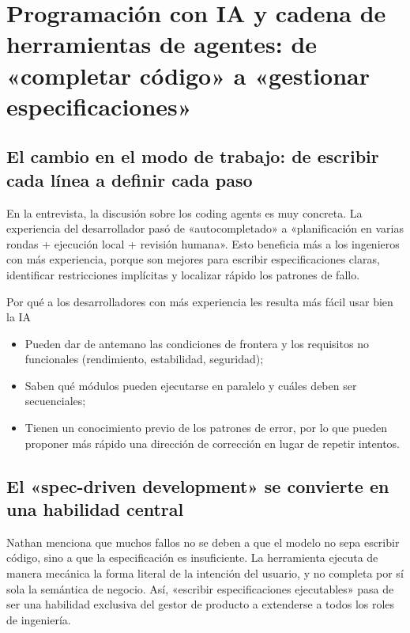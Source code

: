 \section{Programación con IA y cadena de herramientas de agentes: de «completar código» a «gestionar especificaciones»}

\subsection{El cambio en el modo de trabajo: de escribir cada línea a definir cada paso}

En la entrevista, la discusión sobre los coding agents es muy concreta. La experiencia del desarrollador pasó de «autocompletado» a «planificación en varias rondas + ejecución local + revisión humana». Esto beneficia más a los ingenieros con más experiencia, porque son mejores para escribir especificaciones claras, identificar restricciones implícitas y localizar rápido los patrones de fallo.

\begin{importantbox}{Por qué a los desarrolladores con más experiencia les resulta más fácil usar bien la IA}
\begin{itemize}[leftmargin=1.5em]
    \item Pueden dar de antemano las condiciones de frontera y los requisitos no funcionales (rendimiento, estabilidad, seguridad);
    \item Saben qué módulos pueden ejecutarse en paralelo y cuáles deben ser secuenciales;
    \item Tienen un conocimiento previo de los patrones de error, por lo que pueden proponer más rápido una dirección de corrección en lugar de repetir intentos.
\end{itemize}
\end{importantbox}

\subsection{El «spec-driven development» se convierte en una habilidad central}

Nathan menciona que muchos fallos no se deben a que el modelo no sepa escribir código, sino a que la especificación es insuficiente. La herramienta ejecuta de manera mecánica la forma literal de la intención del usuario, y no completa por sí sola la semántica de negocio. Así, «escribir especificaciones ejecutables» pasa de ser una habilidad exclusiva del gestor de producto a extenderse a todos los roles de ingeniería.

